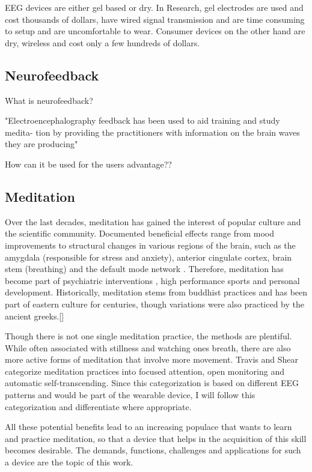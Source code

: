 \documentclass{llncs} %
\begin{document}
EEG devices are either gel based or dry. In Research, gel electrodes are used and cost thousands of dollars, have wired signal transmission and are time consuming to setup and are uncomfortable to wear.
Consumer devices on the other hand are dry, wireless and cost only a few hundreds of dollars. \cite{Decho}
\subsection{Neurofeedback}
What is neurofeedback?

"Electroencephalography feedback has been used to aid training and study medita- tion by providing the practitioners with information on the brain waves they are producing"
\cite{Tang:et al}

How can it be used for the users advantage??
\subsection{Meditation}
Over the last decades, meditation has gained the interest of popular culture and the scientific community.
Documented beneficial effects range from mood improvements to structural changes \cite{Davidson} in various regions of the brain, such as the amygdala (responsible for stress and anxiety), anterior cingulate cortex, brain stem (breathing)
and the default mode network \cite{Tang:et al}.
Therefore, meditation has become part of psychiatric interventions \cite{Hoelzel}, high performance sports and personal development.
Historically, meditation stems from buddhist practices and has been part of eastern culture for centuries, though variations were also practiced by the ancient greeks.[]

Though there is not one single meditation practice, the methods are plentiful. While often associated with stillness and watching ones breath,
there are also more active forms of meditation that involve more movement. Travis and Shear categorize meditation practices into focused attention, open monitoring and automatic self-transcending.\cite{Travis} 
Since this categorization is based on different EEG patterns and would be part of the wearable device, I will follow this categorization and differentiate where appropriate.

All these potential benefits lead to an increasing populace that wants to learn and practice meditation, so that a device that helps in the acquisition of this skill becomes desirable. 
The demands, functions, challenges and applications for such a device are the topic of this work.
\end{document}
